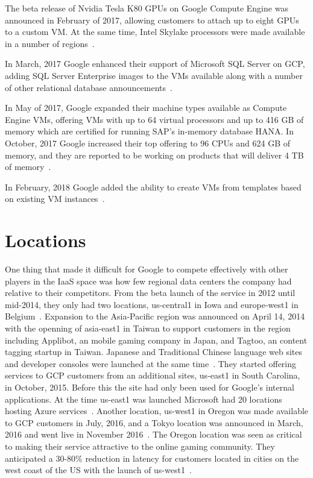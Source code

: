The beta release of Nvidia Tesla K80 GPUs on Google Compute Engine was
announced in February of 2017, allowing customers to attach up to
eight GPUs to a custom VM. At the same time, Intel Skylake processors
were made available in a number of
regions~\cite{hid-sp18-419-googleblog20170221}.

In March, 2017 Google enhanced their support of Microsoft SQL Server
on GCP, adding SQL Server Enterprise images to the VMs available along
with a number of other relational database
announcements~\cite{hid-sp18-419-googleblog20170309}.

In May of 2017, Google expanded their machine types available as
Compute Engine VMs, offering VMs with up to 64 virtual processors and
up to 416 GB of memory which are certified for running SAP's in-memory
database HANA. In October, 2017 Google increased their top offering to
96 CPUs and 624 GB of memory, and they are reported to be working on
products that will deliver 4 TB of
memory~\cite{hid-sp18-419-techcrunch-gce-20171005}.

In February, 2018 Google added the ability to create VMs from
templates based on existing VM
instances~\cite{hid-sp18-419-googleblog20180222}.

\section{Locations}
One thing that made it difficult for Google to compete effectively
with other players in the IaaS space was how few regional data centers
the company had relative to their competitors. From the beta launch of
the service in 2012 until mid-2014, they only had two locations,
us-central1 in Iowa and europe-west1 in
Belgium~\cite{hid-sp18-419-gcp-history-medium}. Expansion to the
Asia-Pacific region was announced on April 14, 2014 with the openning
of asia-east1 in Taiwan to support customers in the region including
Applibot, an mobile gaming company in Japan, and Tagtoo, an content
tagging startup in Taiwan. Japanese and Traditional Chinese language
web sites and developer consoles were launched at the same
time~\cite{hid-sp18-419-googleblog20140414}. They started offering
services to GCP customers from an additional sites, us-east1 in South
Carolina, in October, 2015. Before this the site had only been used
for Google's internal applications. At the time us-east1 was launched
Microsoft had 20 locations hosting Azure
services~\cite{hid-sp18-419-techcrunch-gcp-20151001}. Another
location, us-west1 in Oregon was made available to GCP customers in
July, 2016, and a Tokyo location was announced in March, 2016 and went
live in November 2016~\cite{hid-sp18-419-googleblog20161108}. The
Oregon location was seen as critical to making their service
attractive to the online gaming community. They anticipated a 30-80\%
reduction in latency for customers located in cities on the west coast
of the US with the launch of
us-west1~\cite{hid-sp18-419-googleblog20160720}.

